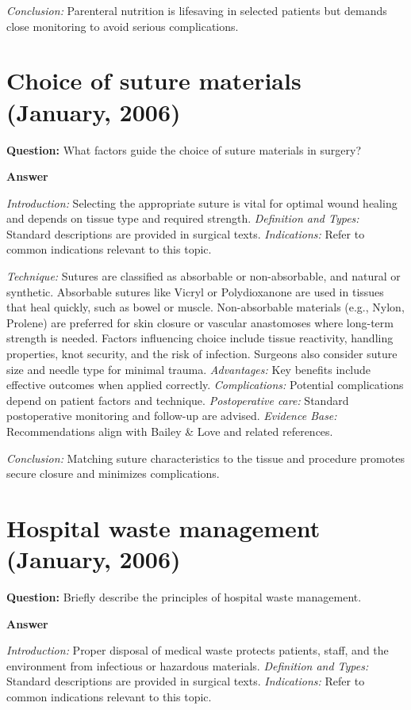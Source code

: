 \documentclass{article}
\begin{document}
\emph{Conclusion:} Parenteral nutrition is lifesaving in selected patients but demands close monitoring to avoid serious complications.


\section{Choice of suture materials (January, 2006)}

\textbf{Question:} What factors guide the choice of suture materials in surgery?

\textbf{Answer}

\emph{Introduction:} Selecting the appropriate suture is vital for optimal wound healing and depends on tissue type and required strength.
\emph{Definition and Types:} Standard descriptions are provided in surgical texts.
\emph{Indications:} Refer to common indications relevant to this topic.

\emph{Technique:} Sutures are classified as absorbable or non-absorbable, and natural or synthetic. Absorbable sutures like Vicryl or Polydioxanone are used in tissues that heal quickly, such as bowel or muscle. Non-absorbable materials (e.g., Nylon, Prolene) are preferred for skin closure or vascular anastomoses where long-term strength is needed. Factors influencing choice include tissue reactivity, handling properties, knot security, and the risk of infection. Surgeons also consider suture size and needle type for minimal trauma.
\emph{Advantages:} Key benefits include effective outcomes when applied correctly.
\emph{Complications:} Potential complications depend on patient factors and technique.
\emph{Postoperative care:} Standard postoperative monitoring and follow-up are advised.
\emph{Evidence Base:} Recommendations align with Bailey \& Love and related references.

\emph{Conclusion:} Matching suture characteristics to the tissue and procedure promotes secure closure and minimizes complications.


\section{Hospital waste management (January, 2006)}

\textbf{Question:} Briefly describe the principles of hospital waste management.

\textbf{Answer}

\emph{Introduction:} Proper disposal of medical waste protects patients, staff, and the environment from infectious or hazardous materials.
\emph{Definition and Types:} Standard descriptions are provided in surgical texts.
\emph{Indications:} Refer to common indications relevant to this topic.
\end{document}
